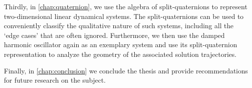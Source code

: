 Thirdly, in \cref{chap:quaternion}, we use the algebra of split-quaternions to represent two-dimensional linear dynamical systems. The split-quaternions can be used to conveniently classify the qualitative nature of such systems, including all the `edge cases' that are often ignored. Furthermore, we then use the damped harmonic oscillator again as an exemplary system and use its split-quaternion representation to analyze the geometry of the associated solution trajectories.

Finally, in \cref{chap:conclusion} we conclude the thesis and provide recommendations for future research on the subject.


